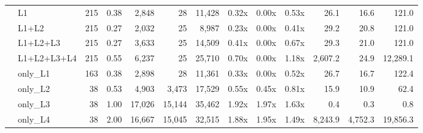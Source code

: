 \begin{tabular}{llrrrrrrrrrrr}
 & L1 & 215 & 0.38 & 2,848 & 28 & 11,428 & 0.32x & 0.00x & 0.53x & 26.1 & 16.6 & 121.0 \\
 & L1+L2 & 215 & 0.27 & 2,032 & 25 & 8,987 & 0.23x & 0.00x & 0.41x & 29.2 & 20.8 & 121.0 \\
 & L1+L2+L3 & 215 & 0.27 & 3,633 & 25 & 14,509 & 0.41x & 0.00x & 0.67x & 29.3 & 21.0 & 121.0 \\
 & L1+L2+L3+L4 & 215 & 0.55 & 6,237 & 25 & 25,710 & 0.70x & 0.00x & 1.18x & 2,607.2 & 24.9 & 12,289.1 \\
 & only\_L1 & 163 & 0.38 & 2,898 & 28 & 11,361 & 0.33x & 0.00x & 0.52x & 26.7 & 16.7 & 122.4 \\
 & only\_L2 & 38 & 0.53 & 4,903 & 3,473 & 17,529 & 0.55x & 0.45x & 0.81x & 15.9 & 10.9 & 62.4 \\
 & only\_L3 & 38 & 1.00 & 17,026 & 15,144 & 35,462 & 1.92x & 1.97x & 1.63x & 0.4 & 0.3 & 0.8 \\
 & only\_L4 & 38 & 2.00 & 16,667 & 15,045 & 32,515 & 1.88x & 1.95x & 1.49x & 8,243.9 & 4,752.3 & 19,856.3 \\
\bottomrule
\end{tabular}
